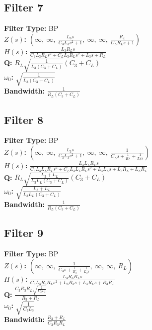 \documentclass{article}
\begin{document}
\subsection*{Filter 7}
\textbf{Filter Type:} BP \\ 
\textbf{$Z(s)$:} $\left( \infty, \  \infty, \  \frac{L_{3} s}{C_{3} L_{3} s^{2} + 1}, \  \infty, \  \infty, \  \frac{R_{L}}{C_{L} R_{L} s + 1}\right)$ \\ 
\textbf{$H(s)$:} $\frac{L_{3} R_{L} s}{C_{3} L_{3} R_{L} s^{2} + C_{L} L_{3} R_{L} s^{2} + L_{3} s + R_{L}}$ \\ 
\textbf{Q:} $R_{L} \sqrt{\frac{1}{L_{3} \left(C_{3} + C_{L}\right)}} \left(C_{3} + C_{L}\right)$ \\ 
\textbf{$\omega_0$:} $\sqrt{\frac{1}{L_{3} \left(C_{3} + C_{L}\right)}}$ \\ 
\textbf{Bandwidth:} $\frac{1}{R_{L} \left(C_{3} + C_{L}\right)}$ \\ 
\subsection*{Filter 8}
\textbf{Filter Type:} BP \\ 
\textbf{$Z(s)$:} $\left( \infty, \  \infty, \  \frac{L_{3} s}{C_{3} L_{3} s^{2} + 1}, \  \infty, \  \infty, \  \frac{1}{C_{L} s + \frac{1}{R_{L}} + \frac{1}{L_{L} s}}\right)$ \\ 
\textbf{$H(s)$:} $\frac{L_{3} L_{L} R_{L} s}{C_{3} L_{3} L_{L} R_{L} s^{2} + C_{L} L_{3} L_{L} R_{L} s^{2} + L_{3} L_{L} s + L_{3} R_{L} + L_{L} R_{L}}$ \\ 
\textbf{Q:} $R_{L} \sqrt{\frac{L_{3} + L_{L}}{L_{3} L_{L} \left(C_{3} + C_{L}\right)}} \left(C_{3} + C_{L}\right)$ \\ 
\textbf{$\omega_0$:} $\sqrt{\frac{L_{3} + L_{L}}{L_{3} L_{L} \left(C_{3} + C_{L}\right)}}$ \\ 
\textbf{Bandwidth:} $\frac{1}{R_{L} \left(C_{3} + C_{L}\right)}$ \\ 
\subsection*{Filter 9}
\textbf{Filter Type:} BP \\ 
\textbf{$Z(s)$:} $\left( \infty, \  \infty, \  \frac{1}{C_{3} s + \frac{1}{R_{3}} + \frac{1}{L_{3} s}}, \  \infty, \  \infty, \  R_{L}\right)$ \\ 
\textbf{$H(s)$:} $\frac{L_{3} R_{3} R_{L} s}{C_{3} L_{3} R_{3} R_{L} s^{2} + L_{3} R_{3} s + L_{3} R_{L} s + R_{3} R_{L}}$ \\ 
\textbf{Q:} $\frac{C_{3} R_{3} R_{L} \sqrt{\frac{1}{C_{3} L_{3}}}}{R_{3} + R_{L}}$ \\ 
\textbf{$\omega_0$:} $\sqrt{\frac{1}{C_{3} L_{3}}}$ \\ 
\textbf{Bandwidth:} $\frac{R_{3} + R_{L}}{C_{3} R_{3} R_{L}}$ \\ 
\end{document}
